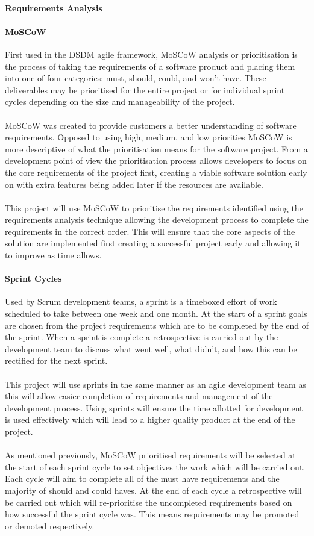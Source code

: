 		\paragraph{Requirements Analysis}
		\paragraph{MoSCoW}
			First used in the DSDM agile framework, MoSCoW analysis or prioritisation is the process of taking the requirements of a software product and placing them into one of four categories; must, should, could, and won't have. These deliverables may be prioritised for the entire project or for individual sprint cycles depending on the size and manageability of the project.
			\\\\
			MoSCoW was created to provide customers a better understanding of software requirements. Opposed to using high, medium, and low priorities MoSCoW is more descriptive of what the prioritisation means for the software project. From a development point of view the prioritisation process allows developers to focus on the core requirements of the project first, creating a viable software solution early on with extra features being added later if the resources are available.
			\\\\
			This project will use MoSCoW to prioritise the requirements identified using the requirements analysis technique allowing the development process to complete the requirements in the correct order. This will ensure that the core aspects of the solution are implemented first creating a successful project early and allowing it to improve as time allows.
		\paragraph{Sprint Cycles}
			Used by Scrum development teams, a sprint is a timeboxed effort of work scheduled to take between one week and one month. At the start of a sprint goals are chosen from the project requirements which are to be completed by the end of the sprint. When a sprint is complete a retrospective is carried out by the development team to discuss what went well, what didn't, and how this can be rectified for the next sprint.
			\\\\
			This project will use sprints in the same manner as an agile development team as this will allow easier completion of requirements and management of the development process. Using sprints will ensure the time allotted for development is used effectively which will lead to a higher quality product at the end of the project.
			\\\\
			As mentioned previously, MoSCoW prioritised requirements will be selected at the start of each sprint cycle to set objectives the work which will be carried out. Each cycle will aim to complete all of the must have requirements and the majority of should and could haves. At the end of each cycle a retrospective will be carried out which will re-prioritise the uncompleted requirements based on how successful the sprint cycle was. This means requirements may be promoted or demoted respectively.
